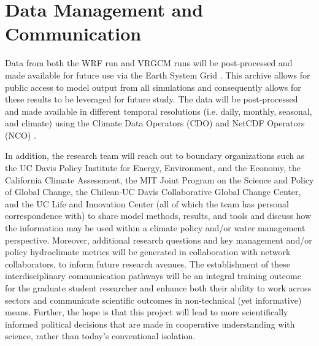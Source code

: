 \documentclass[11pt]{article}
\begin{document}
\setcounter{section}{1}

\section{Data Management and Communication}

Data from both the WRF run and VRGCM runs will be post-processed and made available for future use via the Earth System Grid \citep{williams2009earth}. This archive allows for public access to model output from all simulations and consequently allows for these results to be leveraged for future study.  The data will be post-processed and made available in different temporal resolutions (i.e. daily, monthly, seasonal, and climate) using the Climate Data Operators (CDO) and NetCDF Operators (NCO) \citep{schulzweida2007cdo,zender2006netcdf}.

In addition, the research team will reach out to boundary organizations such as the UC Davis Policy Institute for Energy, Environment, and the Economy, the California Climate Assessment, the MIT Joint Program on the Science and Policy of Global Change, the Chilean-UC Davis Collaborative Global Change Center, and the UC Life and Innovation Center (all of which the team has personal correspondence with) to share model methods, results, and tools and discuss how the information may be used within a climate policy and/or water management perspective.  Moreover, additional research questions and key management and/or policy hydroclimate metrics will be generated in collaboration with network collaborators, to inform future research avenues.  The establishment of these interdisciplinary communication pathways will be an integral training outcome for the graduate student researcher and enhance both their ability to work across sectors and communicate scientific outcomes in non-technical (yet informative) means.  Further, the hope is that this project will lead to more scientifically informed political decisions that are made in cooperative understanding with science, rather than today’s conventional isolation.  

  
\end{document}
